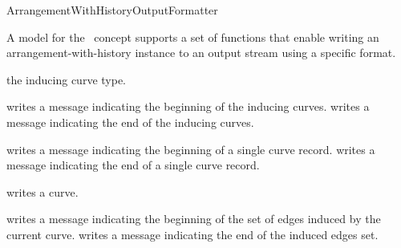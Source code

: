 
\ccRefPageBegin

\begin{ccRefConcept}{ArrangementWithHistoryOutputFormatter}

A model for the \ccRefName\ concept supports a set of functions that enable
writing an arrangement-with-history instance to an output stream using a
specific format.

\ccRefines
{}

\ccTypes


    {the inducing curve type.}




    {writes a message indicating the beginning of the inducing curves.}
\ccGlue
{}
    {writes a message indicating the end of the inducing curves.}

    {writes a message indicating the beginning of a single curve record.}
\ccGlue
{}
    {writes a message indicating the end of a single curve record.}

    {writes a curve.}

    {writes a message indicating the beginning of the set of edges
     induced by the current curve.}
\ccGlue
{}
    {writes a message indicating the end of the induced edges set.}

\ccHasModels


\end{ccRefConcept}

\ccRefPageEnd
